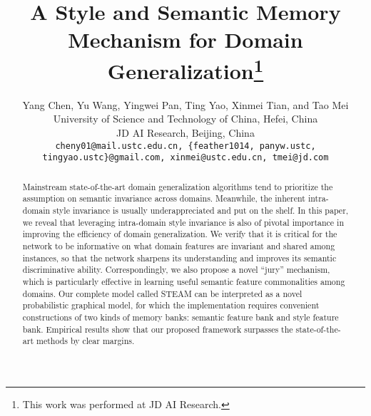 \documentclass[10pt,twocolumn,letterpaper]{article}
\newcommand{\0}{{\bf 0}}
\begin{document}
\title{A Style and Semantic Memory Mechanism for Domain Generalization\thanks{{\small This work was performed at JD AI Research.}}}
\author{Yang Chen, Yu Wang, Yingwei Pan, Ting Yao, Xinmei Tian, and Tao Mei\\
\small  University of Science and Technology of China, Hefei, China\\
\small JD AI Research, Beijing, China
\\
{\tt\scriptsize cheny01@mail.ustc.edu.cn, \{feather1014, panyw.ustc, tingyao.ustc\}@gmail.com, xinmei@ustc.edu.cn, tmei@jd.com}
}

\maketitle
\ificcvfinal\thispagestyle{empty}\fi

\begin{abstract}
Mainstream state-of-the-art domain generalization algorithms tend to prioritize the assumption on semantic invariance across domains. Meanwhile, the inherent intra-domain style invariance is usually underappreciated and put on the shelf. In this paper, we reveal that leveraging intra-domain style invariance is also of pivotal importance in improving the efficiency of domain generalization. We verify that it is critical for the network to be informative on what domain features are invariant and shared among instances, so that the network sharpens its understanding and improves its semantic discriminative ability. Correspondingly, we also propose a novel ``jury'' mechanism, which is particularly effective in learning useful semantic feature commonalities among domains. Our complete model called STEAM can be interpreted as a novel probabilistic graphical model, for which the implementation requires convenient constructions of two kinds of memory banks: semantic feature bank and style feature bank. Empirical results show that our proposed framework surpasses the state-of-the-art methods by clear margins.
\end{abstract}
\end{document}
